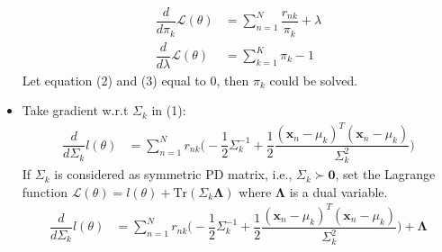 \documentclass[12pt]{article}%
\begin{document}
\begin{itemize}
	\begin{align*}
	\dfrac{d}{d\pi_k}\mathcal{L}(\theta)&=\sum_{n=1}^N\dfrac{r_{nk}}{\pi_k}+\lambda\tag{2}\\
	\dfrac{d}{d\lambda}\mathcal{L}(\theta)&=\sum_{k=1}^K\pi_k-1\tag{3}
	\end{align*}
	Let equation (2) and (3) equal to 0, then $ \pi_k $ could be solved.
	\item Take gradient w.r.t $ \Sigma_k $ in (1):
	\begin{align*}
	\dfrac{d}{d\Sigma_k}l(\theta)&=\sum_{n=1}^Nr_{nk}\Big(-\dfrac{1}{2}\Sigma_k^{-1}+\dfrac{1}{2}\dfrac{(\mathbf{x}_n-\mu_k)^T(\mathbf{x}_n-\mu_k)}{\Sigma_k^{2}}\Big)
	\end{align*}
	If $ \Sigma_k $ is considered as symmetric PD matrix, i.e., $ \Sigma_k\succ\mathbf{0} $, set the Lagrange function $ \mathcal{L}(\theta)=l(\theta)+\text{Tr}(\Sigma_k\mathbf{\Lambda}) $ where $ \mathbf{\Lambda} $ is a dual variable.
	\begin{align*}
	\dfrac{d}{d\Sigma_k}l(\theta)&=\sum_{n=1}^Nr_{nk}\Big(-\dfrac{1}{2}\Sigma_k^{-1}+\dfrac{1}{2}\dfrac{(\mathbf{x}_n-\mu_k)^T(\mathbf{x}_n-\mu_k)}{\Sigma_k^{2}}\Big)+\mathbf{\Lambda}
	\end{align*}
\end{itemize}
\end{document}
